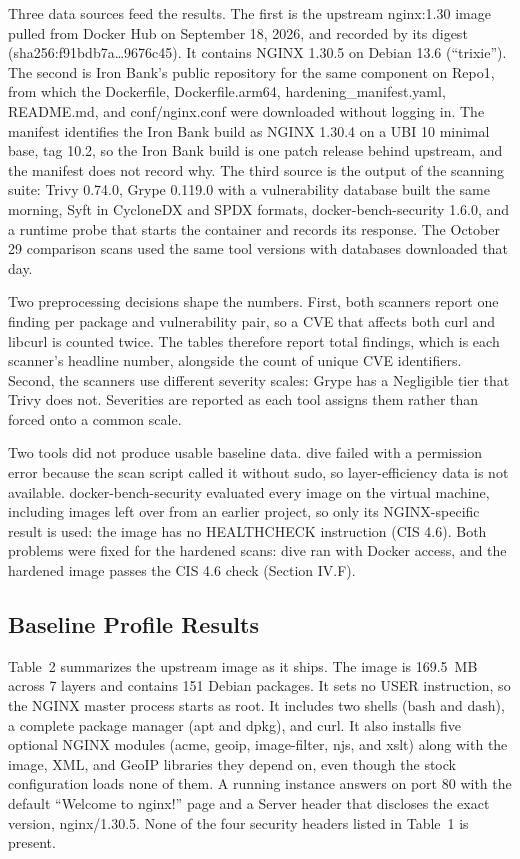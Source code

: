 \documentclass[10pt,letterpaper,twocolumn]{article}
\begin{document}
Three data sources feed the results. The first is the upstream nginx:1.30 image pulled from Docker Hub on September 18, 2026, and recorded by its digest (sha256:f91bdb7a\ldots9676c45). It contains NGINX 1.30.5 on Debian 13.6 (``trixie''). The second is Iron Bank's public repository for the same component on Repo1, from which the Dockerfile, Dockerfile.arm64, hardening\_manifest.yaml, README.md, and conf/nginx.conf were downloaded without logging in. The manifest identifies the Iron Bank build as NGINX 1.30.4 on a UBI 10 minimal base, tag 10.2, so the Iron Bank build is one patch release behind upstream, and the manifest does not record why. The third source is the output of the scanning suite: Trivy 0.74.0, Grype 0.119.0 with a vulnerability database built the same morning, Syft in CycloneDX and SPDX formats, docker-bench-security 1.6.0, and a runtime probe that starts the container and records its response. The October 29 comparison scans used the same tool versions with databases downloaded that day.

Two preprocessing decisions shape the numbers. First, both scanners report one finding per package and vulnerability pair, so a CVE that affects both curl and libcurl is counted twice. The tables therefore report total findings, which is each scanner's headline number, alongside the count of unique CVE identifiers. Second, the scanners use different severity scales: Grype has a Negligible tier that Trivy does not. Severities are reported as each tool assigns them rather than forced onto a common scale.

Two tools did not produce usable baseline data. dive failed with a permission error because the scan script called it without sudo, so layer-efficiency data is not available. docker-bench-security evaluated every image on the virtual machine, including images left over from an earlier project, so only its NGINX-specific result is used: the image has no HEALTHCHECK instruction (CIS 4.6). Both problems were fixed for the hardened scans: dive ran with Docker access, and the hardened image passes the CIS 4.6 check (Section IV.F).

\subsection{Baseline Profile Results}

Table~2 summarizes the upstream image as it ships. The image is 169.5~MB across 7 layers and contains 151 Debian packages. It sets no USER instruction, so the NGINX master process starts as root. It includes two shells (bash and dash), a complete package manager (apt and dpkg), and curl. It also installs five optional NGINX modules (acme, geoip, image-filter, njs, and xslt) along with the image, XML, and GeoIP libraries they depend on, even though the stock configuration loads none of them. A running instance answers on port 80 with the default ``Welcome to nginx!'' page and a Server header that discloses the exact version, nginx/1.30.5. None of the four security headers listed in Table~1 is present.
\end{document}
